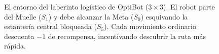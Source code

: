 \begin{figure}[!htb]
\caption{El entorno del laberinto logístico de OptiBot ($3 \times 3$). El robot parte del Muelle ($S_1$) y debe alcanzar la Meta ($S_9$) esquivando la estantería central bloqueada ($S_5$). Cada movimiento ordinario descuenta $-1$ de recompensa, incentivando descubrir la ruta más rápida.}
\label{fig:optibot_gridworld}
\end{figure}

